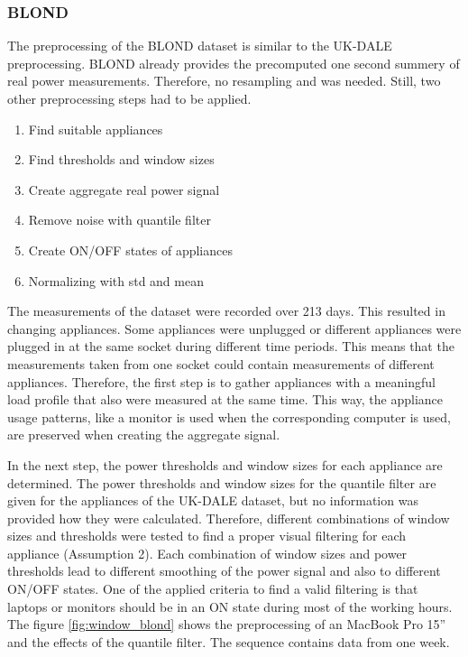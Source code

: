\documentclass[sigconf]{acmart}
\begin{document}
\subsubsection{BLOND}
The preprocessing of the BLOND dataset is similar to the UK-DALE preprocessing. 
BLOND already provides the precomputed one second summery of real power measurements.
Therefore, no resampling and was needed.
Still, two other preprocessing steps had to be applied.

\begin{enumerate}
  \item Find suitable appliances
  \item Find thresholds and window sizes
  \item Create aggregate real power signal
  \item Remove noise with quantile filter
  \item Create ON/OFF states of appliances
  \item Normalizing with std and mean
\end{enumerate}

The measurements of the dataset were recorded over 213 days. 
This resulted in changing appliances.
Some appliances were unplugged or different appliances were plugged in at the same socket during different time periods.
This means that the measurements taken from one socket could contain measurements of different appliances.
Therefore, the first step is to gather appliances with a meaningful load profile that also were measured at the same time.
This way, the appliance usage patterns, like a monitor is used when the corresponding computer is used, are preserved when creating the aggregate signal.

In the next step, the power thresholds and window sizes for each appliance are determined.
The power thresholds and window sizes for the quantile filter are given for the appliances of the UK-DALE dataset, but no information was provided how they were calculated.
Therefore, different combinations of window sizes and thresholds were tested to find a proper visual filtering for each appliance (Assumption 2).
Each combination of window sizes and power thresholds lead to different smoothing of the power signal and also to different ON/OFF states.
One of the applied criteria to find a valid filtering is that laptops or monitors should be in an ON state during most of the working hours.
The figure \ref{fig:window_blond} shows the preprocessing of an MacBook Pro 15'' and the effects of the quantile filter.
The sequence contains data from one week. 
\end{document}

